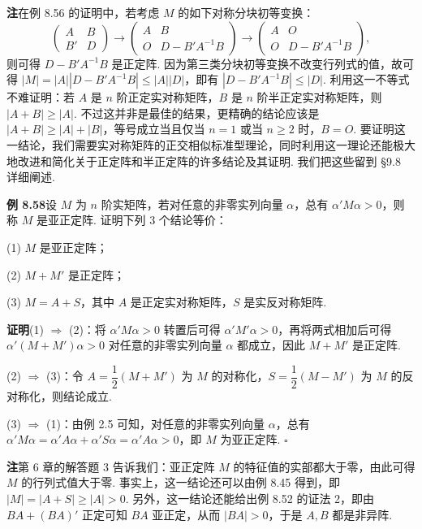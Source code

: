 \documentclass[UTF8,12pt,a4paper,fontset=fandol]{ctexart}
\begin{document}
\noindent\textbf{注}\quad 在例 8.56 的证明中，若考虑 $M$ 的如下对称分块初等变换：
\[
\left(\begin{array}{cc}
A & B\\
B' & D
\end{array}\right)
\to
\left(\begin{array}{cc}
A & B\\
O & D-B'A^{-1}B
\end{array}\right)
\to
\left(\begin{array}{cc}
A & O\\
O & D-B'A^{-1}B
\end{array}\right),
\]
则可得 $D-B'A^{-1}B$ 是正定阵. 因为第三类分块初等变换不改变行列式的值，故可得 $|M|=|A||D-B'A^{-1}B|\le |A||D|$，即有 $|D-B'A^{-1}B|\le |D|$. 利用这一不等式不难证明：若 $A$ 是 $n$ 阶正定实对称矩阵，$B$ 是 $n$ 阶半正定实对称矩阵，则 $|A+B|\ge |A|$. 不过这并非是最佳的结果，更精确的结论应该是 $|A+B|\ge |A|+|B|$，等号成立当且仅当 $n=1$ 或当 $n\ge 2$ 时，$B=O$. 要证明这一结论，我们需要实对称矩阵的正交相似标准型理论，同时利用这一理论还能极大地改进和简化关于正定阵和半正定阵的许多结论及其证明. 我们把这些留到 §9.8 详细阐述.

\noindent\textbf{例 8.58}\quad 设 $M$ 为 $n$ 阶实矩阵，若对任意的非零实列向量 $\alpha$，总有 $\alpha'M\alpha>0$，则称 $M$ 是亚正定阵. 证明下列 3 个结论等价：

(1) $M$ 是亚正定阵；

(2) $M+M'$ 是正定阵；

(3) $M=A+S$，其中 $A$ 是正定实对称矩阵，$S$ 是实反对称矩阵.

\noindent\textbf{证明}\quad (1) $\Rightarrow$ (2)：将 $\alpha'M\alpha>0$ 转置后可得 $\alpha'M'\alpha>0$，再将两式相加后可得 $\alpha'(M+M')\alpha>0$ 对任意的非零实列向量 $\alpha$ 都成立，因此 $M+M'$ 是正定阵.

(2) $\Rightarrow$ (3)：令 $A=\dfrac12(M+M')$ 为 $M$ 的对称化，$S=\dfrac12(M-M')$ 为 $M$ 的反对称化，则结论成立.

(3) $\Rightarrow$ (1)：由例 2.5 可知，对任意的非零实列向量 $\alpha$，总有 $\alpha'M\alpha=\alpha'A\alpha+\alpha'S\alpha=\alpha'A\alpha>0$，即 $M$ 为亚正定阵. $\ensuremath{\square}$

\noindent\textbf{注}\quad 第 6 章的解答题 3 告诉我们：亚正定阵 $M$ 的特征值的实部都大于零，由此可得 $M$ 的行列式值大于零. 事实上，这一结论还可以由例 8.45 得到，即 $|M|=|A+S|\ge |A|>0$. 另外，这一结论还能给出例 8.52 的证法 2，即由 $BA+(BA)'$ 正定可知 $BA$ 亚正定，从而 $|BA|>0$，于是 $A,B$ 都是非异阵.
\end{document}

